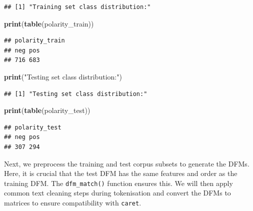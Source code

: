 \documentclass[
]{book}
\newenvironment{Shaded}{\begin{snugshade}}{\end{snugshade}}
\newcommand{\FunctionTok}[1]{\textcolor[rgb]{0.13,0.29,0.53}{\textbf{#1}}}
\newcommand{\NormalTok}[1]{#1}
\newcommand{\StringTok}[1]{\textcolor[rgb]{0.31,0.60,0.02}{#1}}
\begin{document}
\begin{verbatim}
## [1] "Training set class distribution:"
\end{verbatim}

\begin{Shaded}
\begin{Highlighting}[]
\FunctionTok{print}\NormalTok{(}\FunctionTok{table}\NormalTok{(polarity\_train))}
\end{Highlighting}
\end{Shaded}

\begin{verbatim}
## polarity_train
## neg pos 
## 716 683
\end{verbatim}

\begin{Shaded}
\begin{Highlighting}[]
\FunctionTok{print}\NormalTok{(}\StringTok{"Testing set class distribution:"}\NormalTok{)}
\end{Highlighting}
\end{Shaded}

\begin{verbatim}
## [1] "Testing set class distribution:"
\end{verbatim}

\begin{Shaded}
\begin{Highlighting}[]
\FunctionTok{print}\NormalTok{(}\FunctionTok{table}\NormalTok{(polarity\_test))}
\end{Highlighting}
\end{Shaded}

\begin{verbatim}
## polarity_test
## neg pos 
## 307 294
\end{verbatim}

Next, we preprocess the training and test corpus subsets to generate the DFMs. Here, it is crucial that the test DFM has the same features and order as the training DFM. The \texttt{dfm\_match()} function ensures this. We will then apply common text cleaning steps during tokenisation and convert the DFMs to matrices to ensure compatibility with \texttt{caret}.
\end{document}
